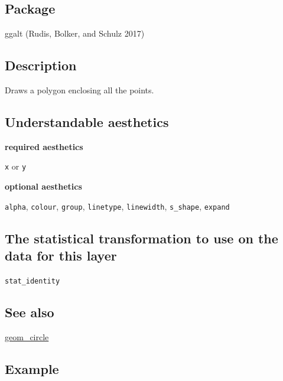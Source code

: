 \documentclass[
  letterpaper,
  DIV=11,
  numbers=noendperiod]{scrreprt}
\begin{document}
\subsection{Package}\label{package-2}

ggalt (Rudis, Bolker, and Schulz 2017)

\subsection{Description}\label{description-2}

Draws a polygon enclosing all the points.

\subsection{Understandable
aesthetics}\label{understandable-aesthetics-3}

\textbf{required aesthetics}

\texttt{x} or \texttt{y}

\textbf{optional aesthetics}

\texttt{alpha}, \texttt{colour}, \texttt{group}, \texttt{linetype},
\texttt{linewidth}, \texttt{s\_shape}, \texttt{expand}

\subsection{The statistical transformation to use on the data for this
layer}\label{the-statistical-transformation-to-use-on-the-data-for-this-layer-2}

\texttt{stat\_identity}

\subsection{See also}\label{see-also-2}

\hyperref[circle]{geom\_circle}

\subsection{Example}\label{example-3}
\end{document}
